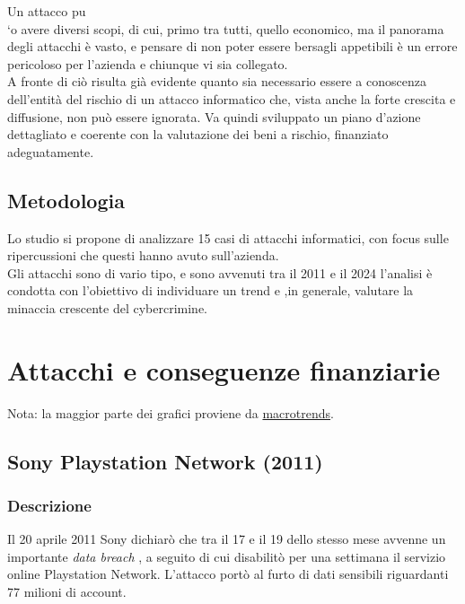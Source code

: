 \documentclass[12pt,a4paper,openright,twoside]{report}
\begin{document}
Un attacco pu\\`o avere diversi scopi, di cui, primo tra tutti, quello economico, ma il panorama degli attacchi \`e vasto, e pensare di non poter essere bersagli appetibili \`e un errore pericoloso per l'azienda e chiunque vi sia collegato. \cite{enisa_threat_landscape}\\
A fronte di ci\`o risulta gi\`a evidente quanto sia necessario essere a conoscenza dell'entit\`a del rischio di un attacco informatico che, vista anche la forte crescita e diffusione, non pu\`o essere ignorata. Va quindi sviluppato un piano d'azione dettagliato e coerente con la valutazione dei beni a rischio, finanziato adeguatamente.\\

\section{Metodologia}
Lo studio si propone di analizzare 15 casi di attacchi informatici, con focus sulle ripercussioni che questi hanno avuto sull'azienda.\\
Gli attacchi sono di vario tipo, e sono avvenuti tra il 2011 e il 2024 l'analisi \`e condotta con l'obiettivo di individuare un trend e ,in generale, valutare la minaccia crescente del cybercrimine.\\  
\clearpage{\pagestyle{empty}\cleardoublepage}



\chapter{Attacchi e conseguenze finanziarie}
Nota: la maggior parte dei grafici proviene da \href{https://www.macrotrends.net/}{macrotrends}.

\section{Sony Playstation Network (2011)}
\subsection{Descrizione}
Il 20 aprile 2011 Sony dichiar\`o che tra il 17 e il 19 dello stesso mese avvenne un importante \textit{data breach} , a seguito di cui disabilit\`o per una settimana il servizio online Playstation Network. L'attacco port\`o al furto di dati sensibili riguardanti 77 milioni di account\cite{Sony_PNT_guardian}\cite{Sony_pnt}.\\
\end{document}
